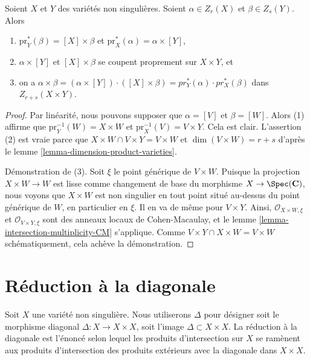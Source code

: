 \begin{lemma}
\label{lemma-exterior-product}
Soient $X$ et $Y$ des variétés non singulières.
Soient $\alpha \in Z_r(X)$ et $\beta \in Z_s(Y)$.
Alors
\begin{enumerate}
\item $\text{pr}_Y^*(\beta) = [X] \times \beta$ et
$\text{pr}_X^*(\alpha) = \alpha \times [Y]$,
\item $\alpha \times [Y]$ et $[X]\times \beta$
se coupent proprement sur $X\times Y$, et
\item on a
$\alpha \times \beta =
(\alpha \times [Y])\cdot ([X]\times\beta) =
pr_Y^*(\alpha) \cdot pr_X^*(\beta)$
dans $Z_{r + s}(X \times Y)$.
\end{enumerate}
\end{lemma}

\begin{proof}
Par linéarité, nous pouvons supposer que $\alpha = [V]$ et $\beta = [W]$.
Alors (1) affirme que $\text{pr}_Y^{-1}(W) = X \times W$ et
$\text{pr}_X^{-1}(V) = V \times Y$. Cela est clair.
L'assertion (2) est vraie parce que $X \times W \cap V \times Y = V \times W$ et
$\dim(V \times W) = r + s$ d'après le lemme \ref{lemma-dimension-product-varieties}.

\medskip\noindent
Démonstration de (3).
Soit $\xi$ le point générique de $V \times W$.
Puisque la projection $X \times W \to W$ est lisse comme changement de base du morphisme
$X \to \Spec(\mathbf{C})$, nous voyons que $X \times W$ est non singulier
en tout point situé au-dessus du point générique de $W$, en particulier en $\xi$.
Il en va de même pour $V \times Y$. Ainsi, $\mathcal{O}_{X \times W, \xi}$
et $\mathcal{O}_{V \times Y, \xi}$ sont des anneaux locaux de Cohen-Macaulay,
et le lemme \ref{lemma-intersection-multiplicity-CM} s'applique.
Comme $V \times Y \cap X \times W = V \times W$ schématiquement,
cela achève la démonstration.
\end{proof}



\section{Réduction à la diagonale}
\label{section-reduction-diagonal}

\noindent
Soit $X$ une variété non singulière. Nous utiliserons $\Delta$
pour désigner soit le morphisme diagonal $\Delta : X \to X \times X$,
soit l'image $\Delta \subset X \times X$.
La réduction à la diagonale est l'énoncé selon lequel
les produits d'intersection sur $X$ se ramènent aux produits d'intersection
des produits extérieurs avec la diagonale dans $X \times X$.

